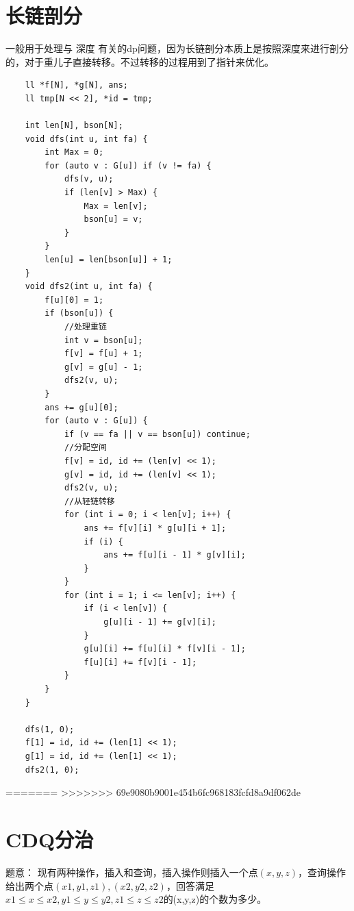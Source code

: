 \documentclass[a4paper,11pt,twoside,fontset = fandol,UTF8]{ctexbook} %
\begin{document}
	\section{长链剖分}
	
	一般用于处理与 深度 有关的dp问题，因为长链剖分本质上是按照深度来进行剖分的，对于重儿子直接转移。不过转移的过程用到了指针来优化。
	
	\begin{lstlisting}
	ll *f[N], *g[N], ans;
	ll tmp[N << 2], *id = tmp;
	
	int len[N], bson[N];
	void dfs(int u, int fa) {
	    int Max = 0;
	    for (auto v : G[u]) if (v != fa) {
	        dfs(v, u);
	        if (len[v] > Max) {
	            Max = len[v];
	            bson[u] = v;
	        }
	    }
	    len[u] = len[bson[u]] + 1;
	}
	void dfs2(int u, int fa) {
	    f[u][0] = 1;
	    if (bson[u]) {
	        //处理重链
	        int v = bson[u];
	        f[v] = f[u] + 1;
	        g[v] = g[u] - 1;
	        dfs2(v, u);
	    }
	    ans += g[u][0];
	    for (auto v : G[u]) {
	        if (v == fa || v == bson[u]) continue;
	        //分配空间
	        f[v] = id, id += (len[v] << 1);
	        g[v] = id, id += (len[v] << 1);
	        dfs2(v, u);
	        //从轻链转移
	        for (int i = 0; i < len[v]; i++) {
	            ans += f[v][i] * g[u][i + 1];
	            if (i) {
	                ans += f[u][i - 1] * g[v][i];
	            }
	        }
	        for (int i = 1; i <= len[v]; i++) {
	            if (i < len[v]) {
	                g[u][i - 1] += g[v][i];
	            }
	            g[u][i] += f[u][i] * f[v][i - 1];
	            f[u][i] += f[v][i - 1];
	        }
	    }
	}
	
	dfs(1, 0);
	f[1] = id, id += (len[1] << 1);
	g[1] = id, id += (len[1] << 1);
	dfs2(1, 0);
	\end{lstlisting}
	
=======
>>>>>>> 69e9080b9001e454b6fc968183fcfd8a9df062de
	\section{CDQ分治}
	题意：
	现有两种操作，插入和查询，插入操作则插入一个点$(x,y,z)$，查询操作给出两个点$(x1,y1,z1),(x2,y2,z2)$，回答满足$x1≤x≤x2,y1≤y≤y2,z1≤z≤z2$的(x,y,z)的个数为多少。
	
\end{document}
